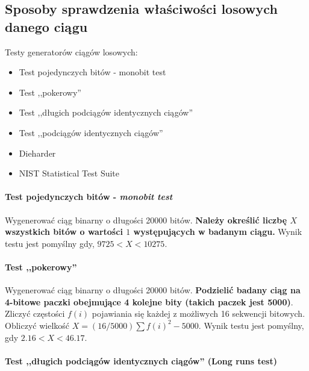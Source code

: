 \documentclass[wi]{zut}
\begin{document}

\subsection{Sposoby sprawdzenia właściwości losowych danego ciągu}

Testy generatorów ciągów losowych:

\begin{itemize}
    \item Test pojedynczych bitów - monobit test
    \item Test ,,pokerowy''
    \item Test ,,długich podciągów identycznych ciągów''
    \item Test ,,podciągów identycznych ciągów''
    \item Dieharder
    \item NIST Statistical Test Suite \cite{Chocian2020_2}
\end{itemize}

\paragraph{Test pojedynczych bitów - \emph{monobit test}}

Wygenerować ciąg binarny o długości 20000 bitów. \textbf{Należy określić liczbę $X$ wszystkich bitów o wartości $1$ występujących w badanym ciągu.} Wynik testu jest pomyślny gdy, $9725 < X < 10275$.

\paragraph{Test ,,pokerowy''}

Wygenerować ciąg binarny o długości 20000 bitów. \textbf{Podzielić badany ciąg na 4-bitowe paczki obejmujące 4 kolejne bity (takich paczek jest 5000)}. Zliczyć częstości $f(i)$ pojawiania się każdej z możliwych 16 sekwencji bitowych. Obliczyć wielkość $X = (16/5000) \sum{f(i)^2} - 5000$. Wynik testu jest pomyślny, gdy $2.16 < X < 46.17$.

\paragraph{Test ,,długich podciągów identycznych ciągów'' (Long runs test)}
\end{document}
